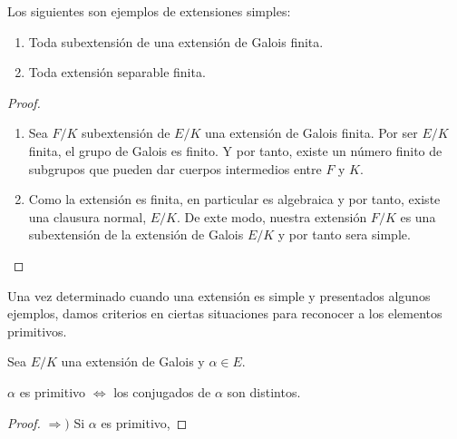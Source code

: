 \begin{proposition}
Los siguientes son ejemplos de extensiones simples:

\begin{enumerate}
\item Toda subextensión de una extensión de Galois finita.
\item Toda extensión separable finita.
\end{enumerate}
\end{proposition}
\begin{proof}
\begin{enumerate}
\item Sea $F/K$ subextensión de $E/K$ una extensión de Galois finita. Por ser $E/K$ finita, el grupo de Galois es finito. Y por tanto, existe un número finito de subgrupos que pueden dar cuerpos intermedios entre $F$ y $K$. 
\item Como la extensión es finita, en particular es algebraica y por tanto, existe una clausura normal, $E/K$. De exte modo, nuestra extensión $F/K$ es una subextensión de la extensión de Galois $E/K$ y por tanto sera simple. 
\end{enumerate}
\end{proof}

Una vez determinado cuando una extensión es simple y presentados algunos ejemplos, damos criterios en ciertas situaciones para reconocer a los elementos primitivos.

\begin{proposition}
Sea $E/K$ una extensión de Galois y $\alpha \in E$.

$\alpha$ es primitivo $\iff$ los conjugados de $\alpha$ son distintos.
\end{proposition}
\begin{proof}
$\Rightarrow)$ Si $\alpha$ es primitivo, 
\end{proof}









